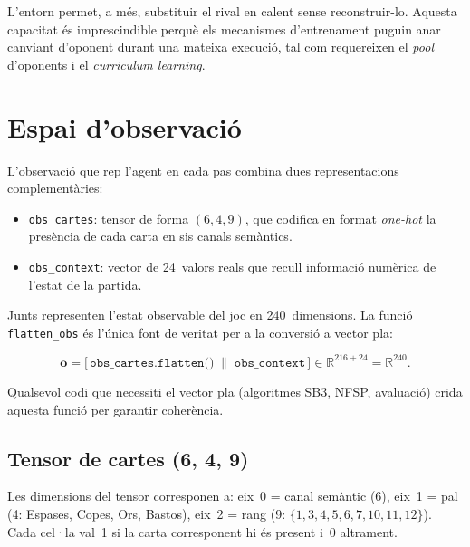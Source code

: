 L'entorn permet, a més, substituir el rival en calent sense reconstruir-lo. Aquesta
capacitat és imprescindible perquè els mecanismes d'entrenament puguin anar canviant
d'oponent durant una mateixa execució, tal com requereixen el \emph{pool} d'oponents
i el \emph{curriculum learning}.

\section{Espai d'observació}
\label{sec:observacio}

L'observació que rep l'agent en cada pas combina dues representacions
complementàries:

\begin{itemize}
  \item \texttt{obs\_cartes}: tensor de forma $(6, 4, 9)$, que codifica en
        format \emph{one-hot} la presència de cada carta en sis canals semàntics.
  \item \texttt{obs\_context}: vector de 24~valors reals que recull informació
        numèrica de l'estat de la partida.
\end{itemize}

Junts representen l'estat observable del joc en 240~dimensions. La funció
\texttt{flatten\_obs} és l'única font de veritat per a la conversió a vector pla:

\begin{equation}
  \mathbf{o} = \bigl[\,\texttt{obs\_cartes.flatten()}\;\|\;\texttt{obs\_context}\,\bigr]
  \in \mathbb{R}^{216+24} = \mathbb{R}^{240}.
  \label{eq:obs-flat}
\end{equation}

Qualsevol codi que necessiti el vector pla (algoritmes SB3, NFSP, avaluació) crida
aquesta funció per garantir coherència.

\subsection*{Tensor de cartes (6, 4, 9)}

Les dimensions del tensor corresponen a: eix~0 = canal semàntic (6), eix~1 = pal
(4: Espases, Copes, Ors, Bastos), eix~2 = rang (9: $\{1,3,4,5,6,7,10,11,12\}$).
Cada cel·la val~1 si la carta corresponent hi és present i~0 altrament.

